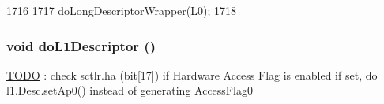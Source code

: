 \begin{DoxyCode}
1716 {
1717     doLongDescriptorWrapper(L0);
1718 }
\end{DoxyCode}
\hypertarget{classArmISA_1_1TableWalker_a837a539f5e07e8785902d5854efde98d}{
\subsubsection[{doL1Descriptor}]{\setlength{\rightskip}{0pt plus 5cm}void doL1Descriptor ()}}
\label{classArmISA_1_1TableWalker_a837a539f5e07e8785902d5854efde98d}


\begin{Desc}
\item[\hyperlink{todo__todo000003}{TODO}]: check sctlr.ha (bit\mbox{[}17\mbox{]}) if Hardware Access Flag is enabled if set, do l1.Desc.setAp0() instead of generating AccessFlag0 \end{Desc}



